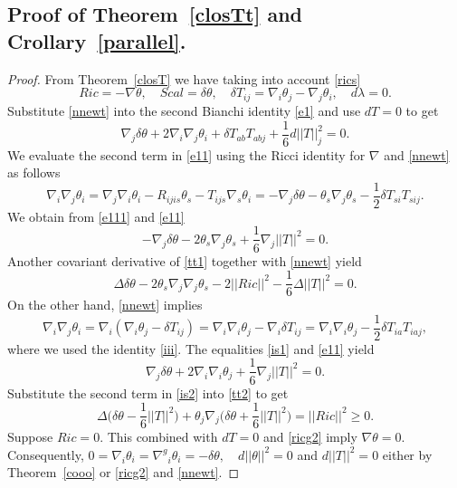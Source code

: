 \documentclass[10pt,british]{article}
\def\sb {{\nabla}}
\def\LC{{\nabla^g}}
\begin{document}
\subsection{Proof of Theorem~\ref{closTt} and Crollary~\ref{parallel}.}
\begin{proof}  %
From Theorem~\ref{closT}  we have taking into account \eqref{rics}
\begin{equation}\label{nnewt}Ric=-\sb\theta, \quad Scal =\delta \theta, \quad \delta T_{ij}=\sb_i\theta_j-\sb_j\theta_i, \quad d\lambda=0.
\end{equation}
Substitute  \eqref{nnewt} into the second Bianchi identity \eqref{e1} and use $dT=0$ to get
\begin{equation}\label{e11}
\sb_j\delta\theta+2\sb_i\sb_j\theta_i+\delta T_{ab}T_{abj}+\frac16d||T||^2_j=0.
\end{equation}
We evaluate the second term in \eqref{e11} using the Ricci identity for $\sb$ and \eqref{nnewt} as follows
\begin{equation}\label{e111}
\sb_i\sb_j\theta_i=\sb_j\sb_i\theta_i-R_{ijis}\theta_s-T_{ijs}\sb_s\theta_i=-\sb_j\delta \theta-\theta_s\sb_j\theta_s-\frac12\delta T_{si}T_{sij}.
\end{equation}
We obtain from \eqref{e111} and \eqref{e11} 
\begin{equation}\label{tt1}
-\sb_j\delta \theta-2\theta_s\sb_j\theta_s+\frac16\sb_j||T||^2=0.
\end{equation}
Another covariant derivative of \eqref{tt1} together with \eqref{nnewt} yield
\begin{equation}\label{tt2}
\Delta\delta\theta-2\theta_s\sb_j\sb_j\theta_s-2||Ric||^2-\frac16\Delta||T||^2=0.
\end{equation}
On the other hand,  \eqref{nnewt} implies 
\begin{equation}\label{is1}
\sb_i\sb_j\theta_i=\sb_i(\sb_i\theta_j-\delta T_{ij})=\sb_i\sb_i\theta_j-\sb_i\delta T_{ij}=\sb_i\sb_i\theta_j-\frac12\delta T_{ia}T_{iaj},
\end{equation}
where we used the  identity \eqref{iii}. 
The equalities \eqref{is1} and \eqref{e11} yield
\begin{equation}\label{is2}
\sb_j\delta \theta+2\sb_i\sb_i\theta_j+\frac16\sb_j||T||^2=0.
\end{equation}
Substitute the second term in \eqref{is2} into \eqref{tt2} to get
\begin{equation}\label{fmax}
\Delta\Big(\delta\theta-\frac16||T||^2 \Big)+\theta_j\sb_j\Big( \delta\theta+\frac16||T||^2\Big)=||Ric||^2\ge 0.
\end{equation}
Suppose $Ric=0$.   This combined with $dT=0$ and \eqref{ricg2} imply $\sb\theta=0$. Consequently, $0=\sb_i\theta_i=\LC_i\theta_i=-\delta\theta, \quad d||\theta||^2=0$ and  $d||T||^2=0$ either by Theorem~\ref{cooo} or \eqref{ricg2} and \eqref{nnewt}.


\end{proof}
\end{document}
